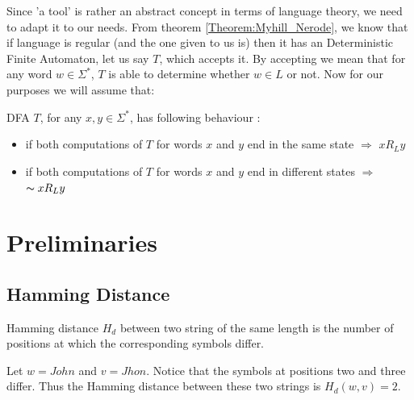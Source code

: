 \documentclass[runningheads, a4paper]{llncs}
\begin{document}
Since 'a tool' is rather an abstract concept in terms of language theory, we need to adapt it to our needs. From theorem \ref{Theorem:Myhill_Nerode}, we know that if language is regular (and the one given to us is) then it has an Deterministic Finite Automaton, let us say $T$, which accepts it. By accepting we mean that for any word $w \in \Sigma^{*}$, $T$ is able to determine whether $w \in L$ or not. Now for our purposes we will assume that:

\begin{definition} \label{def:T}
DFA $T$, for any $x,y \in \Sigma^{*}$, has following behaviour :
\begin{itemize}
  \item if both computations of $T$ for words $x$ and $y$ end in the same state $\Rightarrow$ $x R_{L} y$
  \item if both computations of $T$ for words $x$ and $y$ end in different states $\Rightarrow$ $\thicksim x R_{L} y$
\end{itemize}
\end{definition}

\section{Preliminaries}\label{sec:prelim}


\subsection{Hamming Distance} \label{sec:hamming}

\begin{definition}
Hamming distance $H_d$ between two string of the same length is the number of positions at which the corresponding symbols differ.
\end{definition}

\begin{example} 
Let $w = John$ and $v = Jhon$. Notice that the symbols at positions two and three differ. Thus the Hamming distance between these two strings is $H_d(w,v) = 2$.
\end{example}

\end{document}
